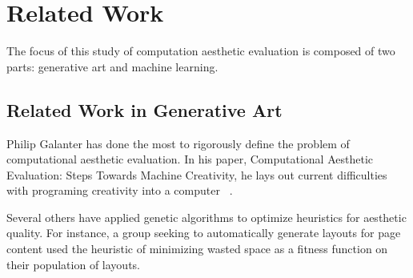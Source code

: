 \documentclass[midd]{thesis}
\begin{document}


\chapter{Related Work}

The focus of this study of computation aesthetic evaluation is composed of two parts: generative art and machine learning.

\section{Related Work in Generative Art}

Philip Galanter has done the most to rigorously define the problem of computational aesthetic evaluation. In his paper, Computational Aesthetic Evaluation: Steps Towards Machine Creativity, he lays out current difficulties with programing creativity into a computer ~\cite{galanter-3}.

Several others have applied genetic algorithms to optimize heuristics for aesthetic quality. For instance, a group
seeking to automatically generate layouts for page content used the heuristic of minimizing wasted space as a fitness
function on their population of layouts.
\end{document}
